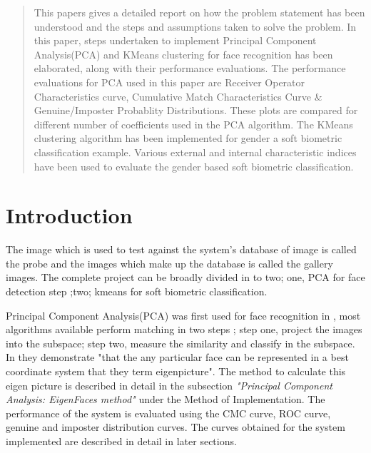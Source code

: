 \documentclass[conference]{IEEEtran}
\begin{document}
\begin{abstract}
This papers gives a detailed report on how the problem statement has been understood and the steps and assumptions taken to solve the problem. In this paper, steps undertaken to implement Principal Component Analysis(PCA) and KMeans clustering for face recognition has been elaborated, along with their performance evaluations. The performance evaluations for PCA used in this paper are Receiver Operator Characteristics curve, Cumulative Match Characteristics Curve \& Genuine/Imposter Probablity Distributions. These plots are compared for different number of coefficients used in the PCA algorithm. The KMeans clustering algorithm has been implemented for gender a soft biometric classification example. Various external and internal characteristic indices have been used to evaluate the gender based soft biometric classification. 

\end{abstract}





%
\IEEEpeerreviewmaketitle



\section{Introduction}
 The image which is used to test against the system's database of image is called the probe and the images which make up the database is called the gallery images. 
The complete project can be broadly divided in to two; one, PCA for face detection step ;two; kmeans for soft biometric classification. 

Principal Component Analysis(PCA) was first used for face recognition in \cite{PcaForFaceFirst}, most algorithms available perform matching in two steps ; step one, project the images into the subspace; step two, measure the similarity and classify in the subspace. In \cite{PcaForFaceFirst} they demonstrate "that the any particular face can be represented in a best coordinate system that they term eigenpicture". The method to calculate this eigen picture is described in detail in the subsection {\sl"Principal Component Analysis: EigenFaces method"} under the Method of Implementation. The performance of the system is evaluated using the CMC curve, ROC curve, genuine and imposter distribution curves. The curves obtained for the system implemented are described in detail in later sections. 
\end{document}
